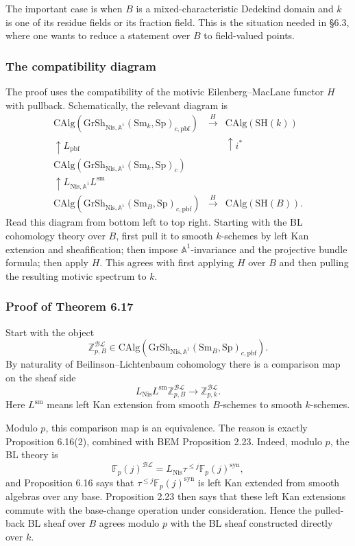 \documentclass[11pt,a4paper]{article}
\newcommand{\Z}{\mathbb Z}
\newcommand{\F}{\mathbb F}
\newcommand{\Aone}{\mathbb A^1}
\newcommand{\Sp}{\mathrm{Sp}}
\newcommand{\SH}{\mathrm{SH}}
\newcommand{\Sm}{\mathrm{Sm}}
\newcommand{\CAlg}{\mathrm{CAlg}}
\newcommand{\Gr}{\mathrm{Gr}}
\newcommand{\Sh}{\mathrm{Sh}}
\newcommand{\Nis}{\mathrm{Nis}}
\newcommand{\BL}{\mathcal{BL}}
\newcommand{\syn}{\mathrm{syn}}
\newcommand{\pbf}{\mathrm{pbf}}
\newcommand{\1}{\mathbf 1}
\newcommand{\sm}{\mathrm{sm}}
\theoremstyle{bemstyle}
\theoremstyle{definition}
\begin{document}
The important case is when \(B\) is a mixed-characteristic Dedekind domain and \(k\) is one of its residue fields or its fraction field. This is the situation needed in \S6.3, where one wants to reduce a statement over \(B\) to field-valued points.

\subsubsection{The compatibility diagram}

The proof uses the compatibility of the motivic Eilenberg--MacLane functor \(H\) with pullback. Schematically, the relevant diagram is
\[
\begin{array}{ccc}
\CAlg(\Gr\Sh_{\Nis,\Aone}(\Sm_k,\Sp)_{c,\pbf}) & \xrightarrow{\ H\ } & \CAlg(\SH(k)) \\
\uparrow L_{\pbf} && \uparrow i^* \\
\CAlg(\Gr\Sh_{\Nis,\Aone}(\Sm_k,\Sp)_{c}) && \\
\uparrow L_{\Nis,\Aone}L^{\sm} && \\
\CAlg(\Gr\Sh_{\Nis,\Aone}(\Sm_B,\Sp)_{c,\pbf}) & \xrightarrow{\ H\ } & \CAlg(\SH(B)).
\end{array}
\]
Read this diagram from bottom left to top right. Starting with the BL cohomology theory over \(B\), first pull it to smooth \(k\)-schemes by left Kan extension and sheafification; then impose \(\Aone\)-invariance and the projective bundle formula; then apply \(H\). This agrees with first applying \(H\) over \(B\) and then pulling the resulting motivic spectrum to \(k\).

\subsubsection{Proof of Theorem 6.17}

Start with the object
\[
  \Z^{\BL}_{p,B}\in\CAlg(\Gr\Sh_{\Nis,\Aone}(\Sm_B,\Sp)_{c,\pbf}).
\]
By naturality of Beilinson--Lichtenbaum cohomology there is a comparison map on the sheaf side
\[
  L_{\Nis}L^{\sm}\Z^{\BL}_{p,B}
  \longrightarrow
  \Z^{\BL}_{p,k}.
\]
Here \(L^{\sm}\) means left Kan extension from smooth \(B\)-schemes to smooth \(k\)-schemes.

Modulo \(p\), this comparison map is an equivalence. The reason is exactly Proposition 6.16(2), combined with BEM Proposition 2.23. Indeed, modulo \(p\), the BL theory is
\[
  \F_p(j)^{\BL}=L_{\Nis}\tau^{\leq j}\F_p(j)^{\syn},
\]
and Proposition 6.16 says that \(\tau^{\leq j}\F_p(j)^{\syn}\) is left Kan extended from smooth algebras over any base. Proposition 2.23 then says that these left Kan extensions commute with the base-change operation under consideration. Hence the pulled-back BL sheaf over \(B\) agrees modulo \(p\) with the BL sheaf constructed directly over \(k\).
\end{document}
